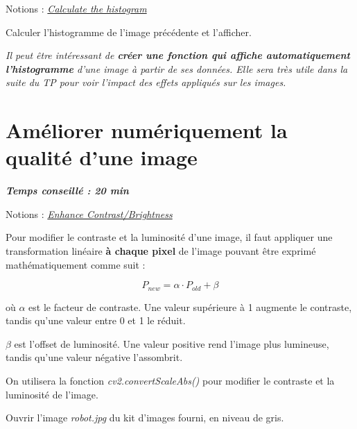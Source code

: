 \documentclass[a4paper,11pt,titlepage]{article} %
\begin{document}
\begin{mdframed}[style=sidebar,frametitle={}]
Notions : \href{https://iogs-lense-training.github.io/image-processing/contents/opencv.html#histogram-of-an-image}{\textit{Calculate the histogram}}
\end{mdframed}

\Manip Calculer l'histogramme de l'image précédente et l'afficher.

\medskip

\textit{Il peut être intéressant de \textbf{créer une fonction qui affiche automatiquement l'histogramme} d'une image à partir de ses données. Elle sera très utile dans la suite du TP pour voir l'impact des effets appliqués sur les images.}


\section{Améliorer numériquement la qualité d'une image}

\begin{center} \textbf{\textit{Temps conseillé : 20 min}} \end{center}

\begin{mdframed}[style=sidebar,frametitle={}]
Notions : \href{https://iogs-lense-training.github.io/image-processing/contents/opencv.html#enhance-the-image-contrast-and-brightness
}{\textit{Enhance Contrast/Brightness}}
\end{mdframed}

Pour modifier le contraste et la luminosité d'une image, il faut appliquer une transformation linéaire \textbf{à chaque pixel} de l'image pouvant être exprimé mathématiquement comme suit :

$$P_{new} = \alpha \cdot P_{old} + \beta$$

où $\alpha$ est le facteur de contraste. Une valeur supérieure à 1 augmente le contraste, tandis qu'une valeur entre 0 et 1 le réduit.

$\beta$ est l'offset de luminosité. Une valeur positive rend l'image plus lumineuse, tandis qu'une valeur négative l'assombrit.

\medskip

On utilisera la fonction \textsl{cv2.convertScaleAbs()} pour modifier le contraste et la luminosité de l'image.

\bigskip

\Manip Ouvrir l'image \textsl{robot.jpg} du kit d'images fourni, en niveau de gris.
\end{document}
